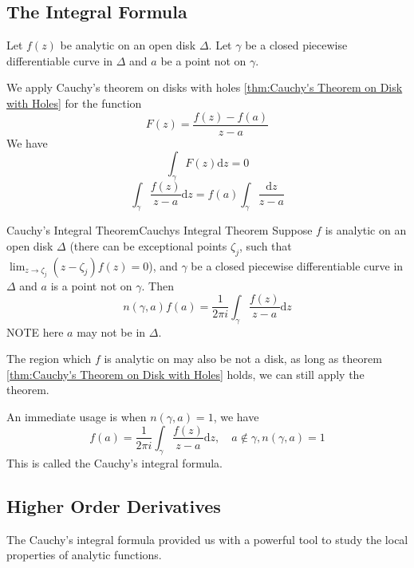 \documentclass[../main.tex]{subfiles}
\begin{document}
\subsection{The Integral Formula}

Let $f(z)$ be analytic on an open disk $\Delta$. Let $\gamma$ be a closed piecewise differentiable curve in $\Delta$ and $a$ be a point not on $\gamma$.

We apply Cauchy's theorem on disks with holes \ref{thm:Cauchy's Theorem on Disk with Holes} for the function
\begin{equation}
F(z) = \frac{f(z)-f(a)}{z-a}
\end{equation}
We have
\begin{equation}
	\int_{\gamma} F(z) \mathrm{d} z = 0
\end{equation}
\begin{equation}
	\int_{\gamma} \frac{f(z)}{z-a} \mathrm{d} z = f(a) \int_{\gamma} \frac{\mathrm{d} z}{z-a}
\end{equation}

\begin{theorem}{Cauchy's Integral Theorem}{Cauchys Integral Theorem}
Suppose $f$ is analytic on an open disk $\Delta$ (there can be exceptional points $\zeta_j$, such that $\lim_{z \to \zeta_j} (z-\zeta_j)f(z) =0$), and $\gamma$ be a closed piecewise differentiable curve in $\Delta$ and $a$ is a point not on $\gamma$. Then
\begin{equation}
	n(\gamma,a) f(a) = \frac{1}{2\pi i} \int_{\gamma} \frac{f(z)}{z-a} \mathrm{d} z
\end{equation}
NOTE here $a$ may not be in $\Delta$.
\end{theorem}

\begin{remark}
	The region which $f$ is analytic on may also be not a disk, as long as theorem \ref{thm:Cauchy's Theorem on Disk with Holes} holds, we can still apply the theorem.
\end{remark}

An immediate usage is when $n(\gamma,a)=1$, we have
\begin{equation}
	f(a) = \frac{1}{2\pi i} \int_{\gamma} \frac{f(z)}{z-a} \mathrm{d} z, \quad a\notin \gamma, n(\gamma,a)=1
\end{equation}
This is called the Cauchy's integral formula.

\subsection{Higher Order Derivatives}
The Cauchy's integral formula provided us with a powerful tool to study the local properties of analytic functions.
\end{document}
